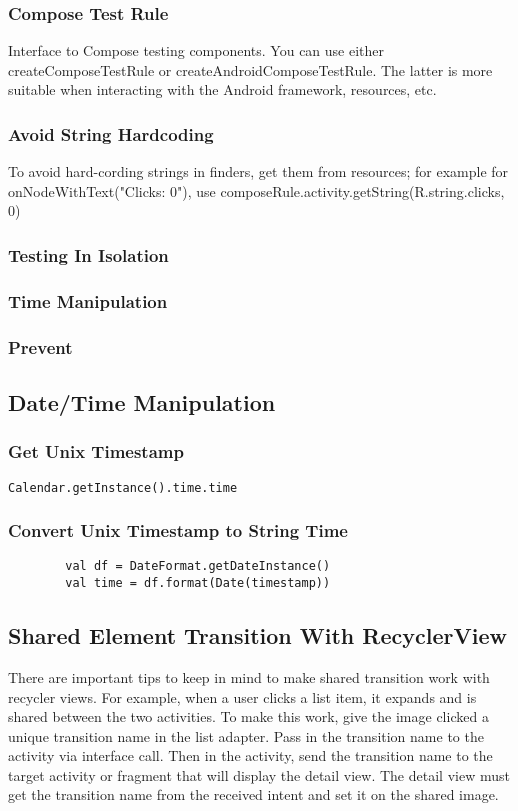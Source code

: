 \documentclass{article}
\begin{document}
\subsubsection{Compose Test Rule}
Interface to Compose testing components. 
You can use either createComposeTestRule or createAndroidComposeTestRule. The latter is more suitable when interacting with the Android framework, resources, etc. 

\subsubsection{Avoid String Hardcoding}
To avoid hard-cording strings in finders, get them from resources; for example for onNodeWithText("Clicks: 0"), use composeRule.activity.getString(R.string.clicks, 0)
\subsubsection{Testing In Isolation}

\subsubsection{Time Manipulation}

\subsubsection{Prevent }


\subsection{Date/Time Manipulation}
\subsubsection{Get Unix Timestamp}
\begin{lstlisting}
Calendar.getInstance().time.time
\end{lstlisting}
\subsubsection{Convert Unix Timestamp to String Time}
\begin{lstlisting}
        val df = DateFormat.getDateInstance()
        val time = df.format(Date(timestamp))
\end{lstlisting}
\subsection{Shared Element Transition With RecyclerView}
There are important tips to keep in mind to make shared transition work with recycler views. For example, when a user clicks a list item, it expands and is shared between the two activities. To make this work, give the image clicked a unique transition name in the list adapter. Pass in the transition name to the activity via interface call. Then in the activity, send the transition name to the target activity or fragment that will display the detail view. The detail view must get the transition name from the received intent and set it on the shared image. 
\end{document}
